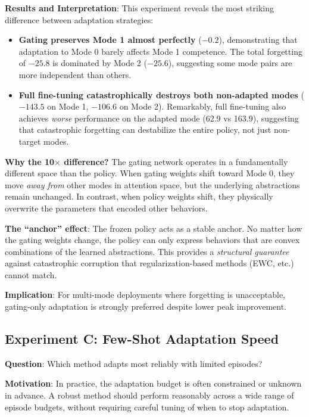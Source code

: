 \documentclass{article}
\begin{document}
\textbf{Results and Interpretation}: This experiment reveals the most striking difference between adaptation strategies:

\begin{itemize}
    \item \textbf{Gating preserves Mode 1 almost perfectly} ($-0.2$), demonstrating that adaptation to Mode 0 barely affects Mode 1 competence. The total forgetting of $-25.8$ is dominated by Mode 2 ($-25.6$), suggesting some mode pairs are more independent than others.
    
    \item \textbf{Full fine-tuning catastrophically destroys both non-adapted modes} ($-143.5$ on Mode 1, $-106.6$ on Mode 2). Remarkably, full fine-tuning also achieves \emph{worse} performance on the adapted mode (62.9 vs 163.9), suggesting that catastrophic forgetting can destabilize the entire policy, not just non-target modes.
\end{itemize}

\textbf{Why the 10$\times$ difference?} The gating network operates in a fundamentally different space than the policy. When gating weights shift toward Mode 0, they move \emph{away from} other modes in attention space, but the underlying abstractions remain unchanged. In contrast, when policy weights shift, they physically overwrite the parameters that encoded other behaviors.

\textbf{The ``anchor'' effect}: The frozen policy acts as a stable anchor. No matter how the gating weights change, the policy can only express behaviors that are convex combinations of the learned abstractions. This provides a \emph{structural guarantee} against catastrophic corruption that regularization-based methods (EWC, etc.) cannot match.

\textbf{Implication}: For multi-mode deployments where forgetting is unacceptable, gating-only adaptation is strongly preferred despite lower peak improvement.

\subsection{Experiment C: Few-Shot Adaptation Speed}

\textbf{Question}: Which method adapts most reliably with limited episodes?

\textbf{Motivation}: In practice, the adaptation budget is often constrained or unknown in advance. A robust method should perform reasonably across a wide range of episode budgets, without requiring careful tuning of when to stop adaptation.
\end{document}
